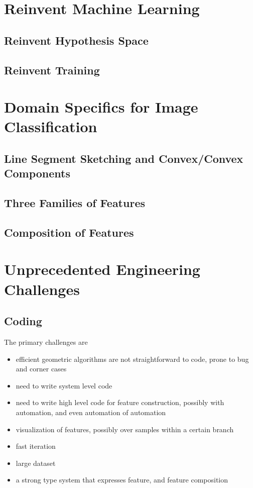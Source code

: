\documentclass[11pt]{article} 	%
\theoremstyle{definition}
\begin{document}
\section{Reinvent Machine Learning}
\subsection{Reinvent Hypothesis Space}

\subsection{Reinvent Training}

\section{Domain Specifics for Image Classification}

\subsection{Line Segment Sketching and Convex/Convex Components}

\subsection{Three Families of Features}

\subsection{Composition of Features}



\section{Unprecedented Engineering Challenges}

\subsection{Coding}

The primary challenges are

\begin{itemize}
	\item efficient geometric algorithms are not straightforward to code, prone to bug and corner cases
	\item need to write system level code
	\item need to write high level code for feature construction, possibly with automation, and even automation of automation
	\item visualization of features, possibly over samples within a certain branch
	\item fast iteration
	\item large dataset
	\item a strong type system that expresses feature, and feature composition
\end{itemize}
\end{document}
